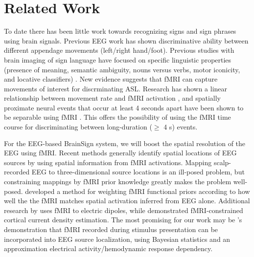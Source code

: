 \documentclass{proposal}
\begin{document}
\section{Related Work}

To date there has been little work towards recognizing signs and sign phrases using brain signals. Previous EEG work has shown discriminative ability between different appendage movements (left/right hand/foot). Previous studies with brain imaging of sign language have focused on specific linguistic properties (presence of meaning, semantic ambiguity, nouns versus verbs, motor iconicity, and locative classifiers) \cite{supp2005_smr, tranel2005_env, lee2006_mme, dehaene1995_eec, hjorth1975_oie, perrin1988_sss, corina2003_llb, emmorey2004_mis, emmorey_broca_region_2006}. New evidence suggests that fMRI can capture movements of interest for discrminating ASL. Research has shown a linear relationship between movement rate and fMRI activation \cite{rao1996rbf}, and spatially proximate neural events that occur at least 4 seconds apart have been shown to be separable using fMRI \cite{kim1997ltr}. This offers the possibility of using the fMRI time course for discriminating between long-duration ($\geq$ 4 s) events.

For the EEG-based BrainSign system, we will boost the spatial resolution of the EEG using fMRI. Recent methods generally identify spatial locations of EEG sources by using spatial information from fMRI activations. Mapping scalp-recorded EEG to three-dimensional source locations is an ill-posed problem, but constraining mappings by fMRI prior knowledge greatly makes the problem well-posed. \cite{im2006tcm} developed a method for weighting fMRI functional priors according to how well the the fMRI matches spatial activation inferred from EEG alone. Additional research by \cite{ahlfors1999sac} uses fMRI to electric dipoles, while \cite{wagner2000fcd} demonstrated fMRI-constrained cortical current density estimation. The most promising for our work may be \cite{dale2000dsp}'s demonstration that fMRI recorded during stimulus presentation can be incorporated into EEG source localization, using Bayesian statistics and an approximation electrical activity/hemodynamic response dependency.
\end{document}
